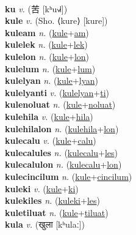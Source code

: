  \label{'kiplostecwon} \\
\textbf{ku} \textit{v.} ({\chinese{}苦} [kʰu˧˩˧])
 \label{ku} \\
\textbf{kule} \textit{v.} (Sho. ⟨kure⟩ [kure])
 \label{kule} \\
\textbf{kuleam} \textit{n.} (\hyperref[kule]{kule}+\hyperref[am]{am})
 \label{kuleam} \\
\textbf{kulelek} \textit{n.} (\hyperref[kule]{kule}+\hyperref[lek]{lek})
 \label{kulelek} \\
\textbf{kulelon} \textit{n.} (\hyperref[kule]{kule}+\hyperref[lon]{lon})
 \label{kulelon} \\
\textbf{kulelum} \textit{n.} (\hyperref[kule]{kule}+\hyperref[lum]{lum})
 \label{kulelum} \\
\textbf{kulelyan} \textit{n.} (\hyperref[kule]{kule}+\hyperref[lyan]{lyan})
 \label{kulelyan} \\
\textbf{kulelyanti} \textit{v.} (\hyperref[kulelyan]{kulelyan}+\hyperref[ti]{ti})
 \label{kulelyanti} \\
\textbf{kulenoluat} \textit{n.} (\hyperref[kule]{kule}+\hyperref[noluat]{noluat})
 \label{kulenoluat} \\
\textbf{kulehila} \textit{v.} (\hyperref[kule]{kule}+\hyperref[hila]{hila})
 \label{kulehila} \\
\textbf{kulehilalon} \textit{n.} (\hyperref[kulehila]{kulehila}+\hyperref[lon]{lon})
 \label{kulehilalon} \\
\textbf{kulecalu} \textit{v.} (\hyperref[kule]{kule}+\hyperref[calu]{calu})
 \label{kulecalu} \\
\textbf{kulecalules} \textit{n.} (\hyperref[kulecalu]{kulecalu}+\hyperref[les]{les})
 \label{kulecalules} \\
\textbf{kulecalulon} \textit{n.} (\hyperref[kulecalu]{kulecalu}+\hyperref[lon]{lon})
 \label{kulecalulon} \\
\textbf{kulecincilum} \textit{n.} (\hyperref[kule]{kule}+\hyperref[cincilum]{cincilum})
 \label{kulecincilum} \\
\textbf{kuleki} \textit{v.} (\hyperref[kule]{kule}+\hyperref[ki]{ki})
 \label{kuleki} \\
\textbf{kulekiles} \textit{n.} (\hyperref[kuleki]{kuleki}+\hyperref[les]{les})
 \label{kulekiles} \\
\textbf{kuletiluat} \textit{n.} (\hyperref[kule]{kule}+\hyperref[tiluat]{tiluat})
 \label{kuletiluat} \\
\textbf{kula} \textit{v.} ({\devanagari{}खुला} [kʰulaː])
 \label{kula} \\
